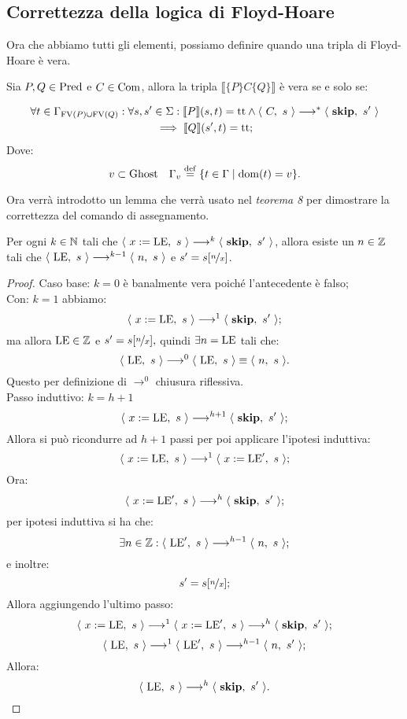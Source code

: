 \subsection{Correttezza della logica di Floyd-Hoare}
Ora che abbiamo tutti gli elementi, possiamo definire quando una tripla di Floyd-Hoare è vera.

\begin{definizione} 
Sia $P,Q \in \mathrm{Pred}$ e $C \in \mathrm{Com}$, allora la tripla
$\llbracket \{P\} C\{Q\} \rrbracket$ è vera se e solo se:

\begin{multline*}
       \forall t \in \Gamma_{\mathrm{FV}(P) \cup \mathrm{FV}(Q)} \mathrel{:}
       \forall  s,s'\in \Sigma \mathrel{:} \llbracket P \rrbracket(s,t) = \mathrm{tt}
       \land \langle\ C,\ s\ \rangle \longrightarrow ^*\langle\ \mathop{\textup{\textbf{skip}}},\ s'\ \rangle\\
       \implies \llbracket Q \rrbracket(s',t)=\mathrm{tt};
\end{multline*}
Dove:
\[
   v \subset \Ghost \quad \Gamma_{v} \defeq \{t \in \Gamma \mid \dom(t) = v \}.
\]
\end{definizione}

Ora verrà introdotto un lemma che verrà usato nel \emph{teorema 8} per
dimostrare la correttezza del comando di assegnamento.
\begin{lemma} 
Per ogni $k \in \mathbb{N} $ tali che $\langle\ x:=\mathrm{LE},\ s\ \rangle \longrightarrow^k\langle\ \mathop{\textup{\textbf{skip}}},\ s'\ \rangle$,
allora esiste un $n \in \mathbb{Z}$ tali che $\langle\ \mathrm{LE},\ s\ \rangle \longrightarrow ^{k-1}\langle\ n,\ s\ \rangle$
e $s'=s [\nicefrac{n}{x}]$.

\begin{proof}
Caso base: $k = 0$ è banalmente vera poiché l'antecedente è falso;\\
Con: $k = 1$ abbiamo:
\[
   \langle\ x:=\mathrm{LE},\ s\ \rangle \longrightarrow ^{1}\langle\ \mathop{\textup{\textbf{skip}}},\ s'\ \rangle;
\]
ma allora $\mathrm{LE} \in \mathbb{Z}$ e $s'=s[\nicefrac{n}{x}],$ quindi $\exists n=\mathrm{LE}$ tali che:
\[
   \langle\ \mathrm{LE},\ s\ \rangle \longrightarrow ^{0}\langle\ \mathrm{LE},\ s\ \rangle \equiv \langle\ n,\ s\ \rangle.
\]
Questo per definizione di $\rightarrow ^0$ chiusura riflessiva.\\
Passo induttivo: $k = h+1$
\[
   \langle\ x:=\mathrm{LE},\ s\ \rangle \longrightarrow ^{h+1}\langle\ \mathop{\textup{\textbf{skip}}},\ s'\ \rangle;
\]
Allora si può ricondurre ad $h+1$ passi per poi applicare l'ipotesi induttiva:
\[
   \langle\ x:=\mathrm{LE},\ s\ \rangle \longrightarrow ^{1}\langle\ x:=\mathrm{LE}',\ s\ \rangle;
\]
Ora:
\[
   \langle\ x:=\mathrm{LE}',\ s\ \rangle \longrightarrow ^{h}\langle\ \mathop{\textup{\textbf{skip}}},\ s'\ \rangle;
\]
per ipotesi induttiva si ha che:
\[
   \exists n \in\mathbb{Z}\mathrel{:} \langle\ \mathrm{LE}',\ s\ \rangle \longrightarrow ^{h-1}\langle\ n,\ s\ \rangle;
\]
e inoltre:
\[
   s'=s [\nicefrac{n}{x}];
\]
Allora aggiungendo l'ultimo passo:
\[
   \langle\ x:=\mathrm{LE},\ s\ \rangle \longrightarrow ^{1}\langle\ x:=\mathrm{LE}',\ s\ \rangle \longrightarrow ^{h} \langle\ \mathop{\textup{\textbf{skip}}},\ s'\ \rangle;
\]
\[
   \langle\ \mathrm{LE},\ s\ \rangle \longrightarrow ^{1}\langle\ \mathrm{LE}',\ s\ \rangle \longrightarrow ^{h-1} \langle\ n,\ s'\ \rangle;
\]
Allora:
\[
   \langle\ \mathrm{LE},\ s\ \rangle \longrightarrow ^{h} \langle\ \mathop{\textup{\textbf{skip}}},\ s'\ \rangle.
\]
\end{proof}
\end{lemma}

